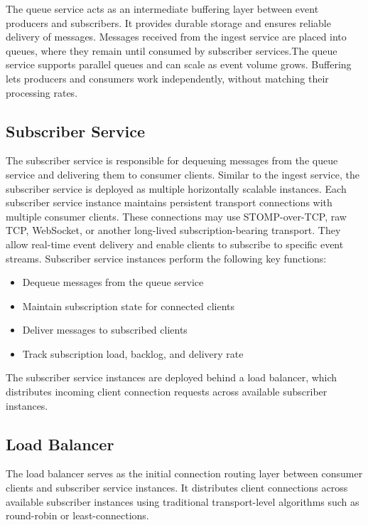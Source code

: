 The queue service acts as an intermediate buffering layer between event producers and subscribers. It provides durable storage and ensures reliable delivery of messages. Messages received from the ingest service are placed into queues, where they remain until consumed by subscriber services.The queue service supports parallel queues and can scale as event volume grows. Buffering lets producers and consumers work independently, without matching their processing rates.

\subsection{Subscriber Service}

The subscriber service is responsible for dequeuing messages from the queue service and delivering them to consumer clients. Similar to the ingest service, the subscriber service is deployed as multiple horizontally scalable instances.
Each subscriber service instance maintains persistent transport connections with multiple consumer clients. These connections may use STOMP-over-TCP, raw TCP, WebSocket, or another long-lived subscription-bearing transport. They allow real-time event delivery and enable clients to subscribe to specific event streams.
Subscriber service instances perform the following key functions:

\begin{itemize}
	\item Dequeue messages from the queue service
	\item Maintain subscription state for connected clients
	\item Deliver messages to subscribed clients
	\item Track subscription load, backlog, and delivery rate
\end{itemize}

The subscriber service instances are deployed behind a load balancer, which distributes incoming client connection requests across available subscriber instances.

\subsection{Load Balancer}

The load balancer serves as the initial connection routing layer between consumer clients and subscriber service instances. It distributes client connections across available subscriber instances using traditional transport-level algorithms such as round-robin or least-connections.

